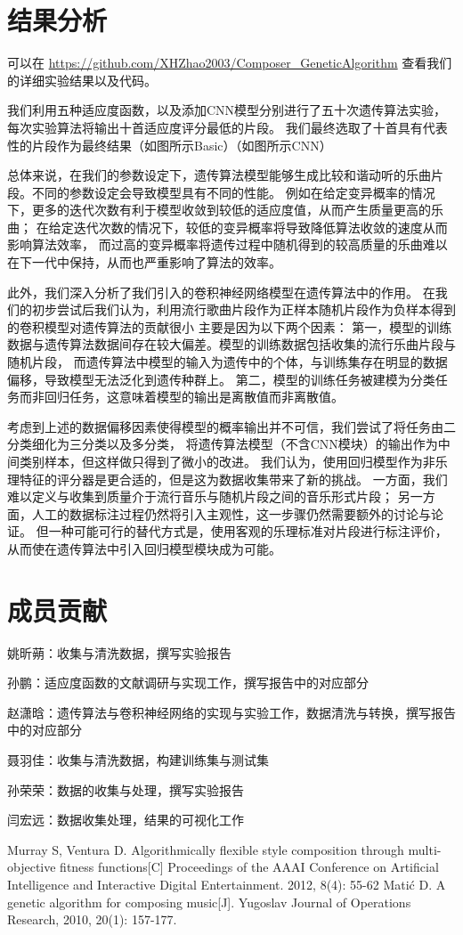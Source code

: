\documentclass{article}
\begin{document}
\section{结果分析}
可以在 \url{https://github.com/XHZhao2003/Composer_GeneticAlgorithm} 查看我们的详细实验结果以及代码。

我们利用五种适应度函数，以及添加CNN模型分别进行了五十次遗传算法实验，每次实验算法将输出十首适应度评分最低的片段。
我们最终选取了十首具有代表性的片段作为最终结果（如图所示Basic）（如图所示CNN）

总体来说，在我们的参数设定下，遗传算法模型能够生成比较和谐动听的乐曲片段。不同的参数设定会导致模型具有不同的性能。
例如在给定变异概率的情况下，更多的迭代次数有利于模型收敛到较低的适应度值，从而产生质量更高的乐曲；
在给定迭代次数的情况下，较低的变异概率将导致降低算法收敛的速度从而影响算法效率，
而过高的变异概率将遗传过程中随机得到的较高质量的乐曲难以在下一代中保持，从而也严重影响了算法的效率。

此外，我们深入分析了我们引入的卷积神经网络模型在遗传算法中的作用。
在我们的初步尝试后我们认为，利用流行歌曲片段作为正样本随机片段作为负样本得到的卷积模型对遗传算法的贡献很小
主要是因为以下两个因素：
第一，模型的训练数据与遗传算法数据间存在较大偏差。模型的训练数据包括收集的流行乐曲片段与随机片段，
而遗传算法中模型的输入为遗传中的个体，与训练集存在明显的数据偏移，导致模型无法泛化到遗传种群上。
第二，模型的训练任务被建模为分类任务而非回归任务，这意味着模型的输出是离散值而非离散值。

考虑到上述的数据偏移因素使得模型的概率输出并不可信，我们尝试了将任务由二分类细化为三分类以及多分类，
将遗传算法模型（不含CNN模块）的输出作为中间类别样本，但这样做只得到了微小的改进。
我们认为，使用回归模型作为非乐理特征的评分器是更合适的，但是这为数据收集带来了新的挑战。
一方面，我们难以定义与收集到质量介于流行音乐与随机片段之间的音乐形式片段；
另一方面，人工的数据标注过程仍然将引入主观性，这一步骤仍然需要额外的讨论与论证。
但一种可能可行的替代方式是，使用客观的乐理标准对片段进行标注评价，从而使在遗传算法中引入回归模型模块成为可能。

\section{成员贡献}
姚昕蒴：收集与清洗数据，撰写实验报告

孙鹏：适应度函数的文献调研与实现工作，撰写报告中的对应部分

赵潇晗：遗传算法与卷积神经网络的实现与实验工作，数据清洗与转换，撰写报告中的对应部分

聂羽佳：收集与清洗数据，构建训练集与测试集

孙荣荣：数据的收集与处理，撰写实验报告

闫宏远：数据收集处理，结果的可视化工作


\begin{thebibliography}{2}
    Murray S, Ventura D. Algorithmically flexible style composition through multi-objective fitness functions[C] Proceedings of the AAAI Conference on Artificial Intelligence and Interactive Digital Entertainment. 2012, 8(4): 55-62
    Matić D. A genetic algorithm for composing music[J]. Yugoslav Journal of Operations Research, 2010, 20(1): 157-177.
\end{thebibliography}
\end{document}
